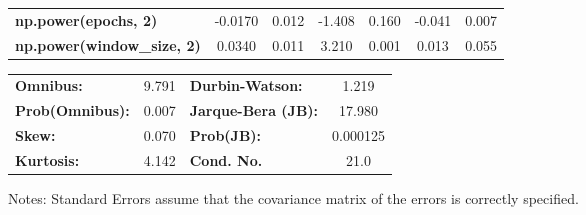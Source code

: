 \begin{center}
\begin{tabular}{lcccccc}
\textbf{np.power(epochs, 2)}         &      -0.0170  &        0.012     &    -1.408  &         0.160        &       -0.041    &        0.007     \\
\textbf{np.power(window\_size, 2)}   &       0.0340  &        0.011     &     3.210  &         0.001        &        0.013    &        0.055     \\
\bottomrule
\end{tabular}
\begin{tabular}{lclc}
\textbf{Omnibus:}       &  9.791 & \textbf{  Durbin-Watson:     } &    1.219  \\
\textbf{Prob(Omnibus):} &  0.007 & \textbf{  Jarque-Bera (JB):  } &   17.980  \\
\textbf{Skew:}          &  0.070 & \textbf{  Prob(JB):          } & 0.000125  \\
\textbf{Kurtosis:}      &  4.142 & \textbf{  Cond. No.          } &     21.0  \\
\bottomrule
\end{tabular}
\end{center}

Notes: \newline
 [1] Standard Errors assume that the covariance matrix of the errors is correctly specified.